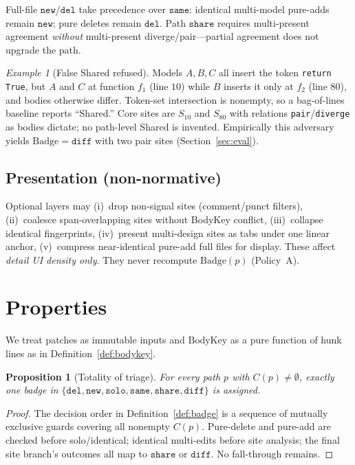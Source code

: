 \documentclass[
  11pt,
  a4paper,
  oneside,
  numbers=noenddot,
  abstract=true,
  headings=normal,
  DIV=11,
  BCOR=0mm,
]{scrartcl}
\theoremstyle{definition}
\theoremstyle{plain}
\newtheorem{proposition}[definition]{Proposition}
\theoremstyle{remark}
\newtheorem{example}[definition]{Example}
\newcommand{\badge}[1]{\texttt{#1}}
\newcommand{\BodyKey}{\mathrm{BodyKey}}
\newcommand{\Badge}{\mathrm{Badge}}
\begin{document}
Full-file $\badge{new}$/$\badge{del}$ take precedence over $\badge{same}$:
identical multi-model pure-adds remain $\badge{new}$; pure deletes remain
$\badge{del}$. Path $\badge{share}$ requires multi-present agreement
\emph{without} multi-present diverge/pair---partial agreement does not
upgrade the path.

\begin{example}[False Shared refused]
\label{ex:false-shared}
Models $A,B,C$ all insert the token \texttt{return True}, but $A$ and $C$
at function $f_1$ (line $10$) while $B$ inserts it only at $f_2$ (line $80$),
and bodies otherwise differ. Token-set intersection is nonempty, so a
bag-of-lines baseline reports ``Shared.'' Core sites are $S_{10}$ and
$S_{80}$ with relations \texttt{pair}/\texttt{diverge} as bodies dictate;
no path-level Shared is invented. Empirically this adversary yields
$\Badge=\badge{diff}$ with two pair sites (Section~\ref{sec:eval}).
\end{example}

\subsection{Presentation (non-normative)}

Optional layers may (i)~drop non-signal sites (comment/punct filters),
(ii)~coalesce span-overlapping sites without BodyKey conflict,
(iii)~collapse identical fingerprints, (iv)~present multi-design sites as
tabs under one linear anchor, (v)~compress near-identical pure-add full
files for display. These affect \emph{detail UI density only}. They never
recompute $\Badge(p)$ (Policy~A).

\section{Properties}
\label{sec:props}

We treat patches as immutable inputs and $\BodyKey$ as a pure function of
hunk lines as in Definition~\ref{def:bodykey}.

\begin{proposition}[Totality of triage]
\label{prop:total}
For every path $p$ with $C(p)\neq\emptyset$, exactly one badge in
$\{\badge{del},\badge{new},\badge{solo},\badge{same},\badge{share},\badge{diff}\}$
is assigned.
\end{proposition}

\begin{proof}
The decision order in Definition~\ref{def:badge} is a sequence of mutually
exclusive guards covering all nonempty $C(p)$. Pure-delete and pure-add are
checked before solo/identical; identical multi-edits before site analysis;
the final site branch's outcomes all map to $\badge{share}$ or $\badge{diff}$.
No fall-through remains.
\end{proof}
\end{document}
